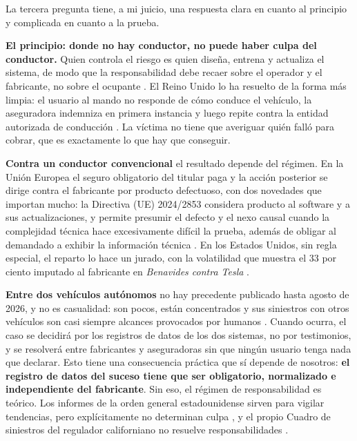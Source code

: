 \documentclass[11pt,letterpaper]{article}
\begin{document}
La tercera pregunta tiene, a mi juicio, una respuesta clara en cuanto al
principio y complicada en cuanto a la prueba.

\textbf{El principio: donde no hay conductor, no puede haber culpa del
conductor.} Quien controla el riesgo es quien diseña, entrena y actualiza el
sistema, de modo que la responsabilidad debe recaer sobre el operador y el
fabricante, no sobre el ocupante \parencite{shavell1980}. El Reino Unido lo ha
resuelto de la forma más limpia: el usuario al mando no responde de cómo conduce
el vehículo, la aseguradora indemniza en primera instancia y luego repite contra
la entidad autorizada de conducción \parencite{ukaeva2018,ukavact2024,cms2024}. La
víctima no tiene que averiguar quién falló para cobrar, que es exactamente lo que
hay que conseguir.

\textbf{Contra un conductor convencional} el resultado depende del régimen. En la
Unión Europea el seguro obligatorio del titular paga y la acción posterior se
dirige contra el fabricante por producto defectuoso, con dos novedades que
importan mucho: la Directiva (UE) 2024/2853 considera producto al software y a
sus actualizaciones, y permite presumir el defecto y el nexo causal cuando la
complejidad técnica hace excesivamente difícil la prueba, además de obligar al
demandado a exhibir la información técnica \parencite{eupld2024,reedsmith2025}.
En los Estados Unidos, sin regla especial, el reparto lo hace un jurado, con la
volatilidad que muestra el 33 por ciento imputado al fabricante en
\emph{Benavides contra Tesla} \parencite{wshb2025}.

\textbf{Entre dos vehículos autónomos} no hay precedente publicado hasta agosto
de 2026, y no es casualidad: son pocos, están concentrados y sus siniestros con
otros vehículos son casi siempre alcances provocados por humanos
\parencite{lee2026,dmv2026}. Cuando ocurra, el caso se decidirá por los registros
de datos de los dos sistemas, no por testimonios, y se resolverá entre
fabricantes y aseguradoras sin que ningún usuario tenga nada que declarar. Esto
tiene una consecuencia práctica que sí depende de nosotros: \textbf{el registro
de datos del suceso tiene que ser obligatorio, normalizado e independiente del
fabricante}. Sin eso, el régimen de responsabilidad es teórico. Los informes de
la orden general estadounidense sirven para vigilar tendencias, pero
explícitamente no determinan culpa \parencite{nhtsasgo2026}, y el propio Cuadro
de siniestros del regulador californiano no resuelve responsabilidades
\parencite{dmv2026}.
\end{document}
